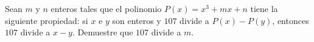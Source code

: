 Sean $m$ y $n$ enteros tales que el polinomio $P(x) = x^3 + mx + n$ tiene la siguiente propiedad: si $x$ e $y$ son enteros y $107$ divide a $P(x) - P(y)$, entonces $107$ divide a $x-y$. Demuestre que $107$ divide a $m$.
